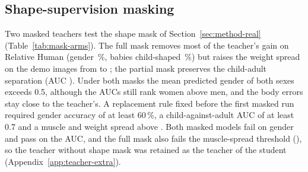 \subsection{Shape-supervision masking}
\label{sec:res-mask}



Two masked teachers test the shape mask of Section~\ref{sec:method-real} (Table~\ref{tab:mask-arms}). The full mask
removes most of the teacher's gain on Relative Human (gender \RHGenderMasked\,\%, babies child-shaped
\RHBabiesBelowMasked\,\%) but raises the weight spread on the demo images from \SpreadWeightFinal{} to
\SpreadWeightMasked; the partial mask preserves the child-adult separation (AUC \RHAUCPartial). Under both masks the mean predicted
gender of both sexes exceeds 0.5, although the AUCs still rank women above men, and the body errors stay close to
the teacher's. A replacement rule fixed before the first masked run required gender accuracy of at least 60\,\%, a
child-against-adult AUC of at least 0.7 and a muscle and weight spread above \SpreadRuleThreshold. Both masked models
fail on gender and pass on the AUC, and the full mask also fails the muscle-spread threshold
(\SpreadMuscleMasked), so the teacher without shape mask was retained as the teacher of the student
(Appendix~\ref{app:teacher-extra}).

